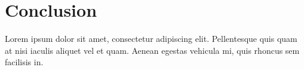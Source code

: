\chapter{Conclusion}
\label{cha:conclusion}

Lorem ipsum dolor sit amet, consectetur adipiscing elit. Pellentesque quis quam at nisi iaculis aliquet vel et quam. Aenean egestas vehicula mi, quis rhoncus sem facilisis in.
